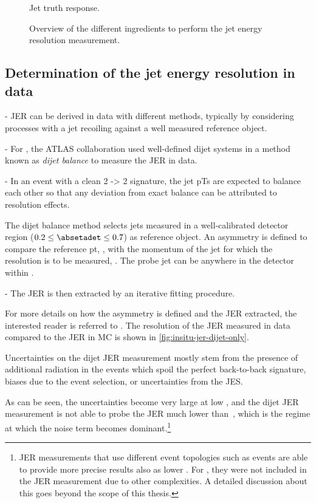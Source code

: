 \begin{figure}
    \caption{Jet truth response.}
    \label{fig:truth-response}
\end{figure}

\FloatBarrier
\begin{figure}
    \caption{Overview of the different ingredients to perform the jet energy resolution measurement.}
    \label{fig:flow-chart-jer}
\end{figure}


\subsection{Determination of the jet energy resolution in data}
- JER can be derived in data with different methods, typically by considering processes with a jet recoiling against a well measured reference object.

- For \RunTwo, the ATLAS collaboration used well-defined dijet systems in a method known as \emph{dijet balance} to measure the JER in data.

- In an event with a clean 2 -> 2 signature, the jet pTs are expected to balance each other so that any deviation from exact balance can be attributed to resolution effects.

The dijet balance method selects jets measured in a well-calibrated detector region ($0.2 \leq \absetadet \leq 0.7$) as reference object. An asymmetry is defined to compare the reference pt, \pTref, with the momentum of the jet for which the resolution is to be measured, \pTprobe. The probe jet can be anywhere in the detector within .

- The JER is then extracted by an iterative fitting procedure.

For more details on how the asymmetry is defined and the JER extracted, the interested reader is referred to . The resolution of the JER measured in data compared to the JER in MC is shown in \cref{fig:insitu-jer-dijet-only}.

Uncertainties on the dijet JER measurement mostly stem from the presence of additional radiation in the events which spoil the perfect back-to-back signature, biases due to the event selection, or uncertainties from the JES.

As can be seen, the uncertainties become very large at low \pT, and the dijet JER measurement is not able to probe the JER much lower than \,\GeV, which is the regime at which the noise term becomes dominant.\footnote{JER measurements that use different event topologies such as \Zjets events are able to provide more precise results also as lower \pT. For \RunTwo, they were not included in the JER measurement due to other complexities. A detailed discussion about this goes beyond the scope of this thesis.}

